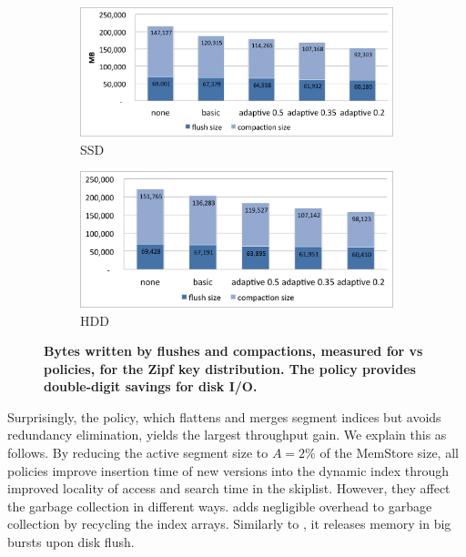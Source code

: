 \begin{figure}[t]
  \centering
  
  \begin{subfigure}[t]{\columnwidth}
      \includegraphics[width=\figw]{Figs/volume-ssd.png}
      \caption[]{SSD}
    \label{fig:volume:ssd}
  \end{subfigure}
  \begin{subfigure}[t]{\columnwidth}
      \includegraphics[width=\figw]{Figs/volume-hdd.png}
      \caption[]{HDD}
    \label{fig:volume:hdd}
  \end{subfigure}

  \caption{\textbf{Bytes written by flushes and compactions, measured for \none\/ vs \sys\/ policies, for the Zipf key distribution. 
  The \adp\/ policy provides double-digit savings for disk I/O. }}
  \label{fig:volume}
\end{figure}
Surprisingly, the \basic\/ policy, which flattens and merges segment indices but avoids 
redundancy elimination, yields the largest throughput gain. We explain this as follows. By reducing the active 
segment size to $A=2$\% of the MemStore size, all \sys\/ policies improve insertion time of new versions 
into the dynamic index through improved locality of access and search time in the skiplist. However, 
they affect the garbage collection in different ways. \basic\/ adds negligible overhead to 
garbage collection by recycling the index arrays. Similarly to \none, it releases memory in big bursts
upon disk flush. 

